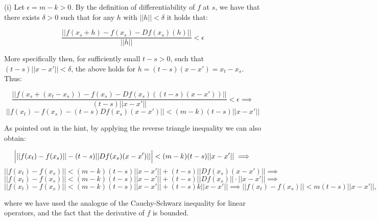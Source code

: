 \begin{solution}
    
    (i) Let $\epsilon = m - k > 0$.
    By the definition of differentiability of $f$ at $s$, we have that there exists $\delta > 0$ such that for any $h$ with $\lvert \lvert h \rvert \rvert < \delta$ it holds that:

    $$\frac{\lvert \lvert f(x_s + h) - f(x_s) - Df(x_s)(h) \rvert \rvert}{\lvert \lvert h \rvert \rvert} < \epsilon$$

    More specifically then, for sufficiently small $t - s > 0$, such that $(t - s)\lvert \lvert x - x' \rvert \rvert < \delta$, the above holds for $h = (t - s) (x - x') = x_t - x_s$.
    Thus:

    $$\frac{\lvert \lvert f(x_s + (x_t - x_s)) - f(x_s) - Df(x_s)((t - s)(x - x'))\rvert \rvert}{(t - s)\lvert \lvert x - x' \rvert \rvert} < \epsilon \implies$$
    $$\lvert \lvert f(x_t) - f(x_s) - (t - s)Df(x_s)(x - x') \rvert \rvert <(m - k)(t - s)\lvert \lvert x - x' \rvert \rvert$$

    As pointed out in the hint, by applying the reverse triangle inequality we can also obtain:

    $$\Bigl \lvert \lvert \lvert f(x_t) - f(x_s) \rvert \rvert - (t - s)\lvert \lvert Df(x_s)(x - x') \rvert \rvert \Bigr \rvert < (m - k)(t - s) \lvert \lvert x - x' \rvert \rvert \implies $$
    $$\lvert \lvert f(x_t) - f(x_s) \rvert \rvert < (m - k)(t - s)\lvert \lvert x - x' \rvert \rvert + (t - s)\lvert \lvert Df(x_s)(x - x') \rvert \rvert \implies$$
    $$\lvert \lvert f(x_t) - f(x_s) \rvert \rvert < (m - k)(t - s) \lvert \lvert x - x' \rvert \rvert + (t - s)\lvert \lvert Df(x_s) \rvert \rvert \cdot \lvert \lvert x - x' \rvert \rvert \implies $$
    $$\lvert \lvert f(x_t) - f(x_s) \rvert \rvert < (m - k)(t - s)\lvert \lvert x - x' \rvert \rvert + (t -s)k \lvert \lvert x - x' \rvert \rvert \implies \lvert \lvert f(x_t) - f(x_s) \rvert \rvert < m(t -s)\lvert \lvert x - x' \rvert \rvert,$$

    where we have used the analogue of the Cauchy-Schwarz inequality for linear operators, and the fact that the derivative of $f$ is bounded.


\end{solution}
